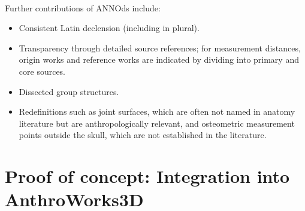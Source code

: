 \documentclass[sw]{iosart2x}
\newcommand{\aw}{AnthroWorks3D}
\begin{document}
\paragraph{}
Further contributions of ANNOds include:
\begin{itemize}
\item Consistent Latin declension (including in plural).
\item Transparency through detailed source references; for measurement distances, origin works and reference works are indicated by dividing into primary and core sources.
\item Dissected group structures.
\item Redefinitions such as joint surfaces, which are often not named in anatomy literature but are anthropologically relevant, and osteometric measurement points outside the skull, which are not established in the literature.
\end{itemize}




\section{Proof of concept: Integration into \aw{}}\label{sec:integration}
\end{document}
